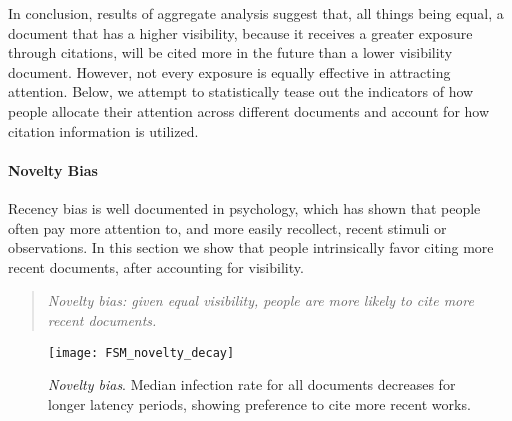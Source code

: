 \documentclass[10pt]{bmc_article}
\newenvironment{bmcformat}{\baselineskip20pt\sloppy\setboolean{publ}{false}}{\baselineskip20pt\sloppy}
\begin{document}
\begin{bmcformat}
In conclusion, results of aggregate analysis suggest that, all things being equal, a document that has a higher visibility, because it receives a greater exposure through citations, will be cited more in the future than a lower visibility document.
However, not every exposure is equally effective in attracting attention. Below, we attempt to statistically tease out the indicators of how people allocate their attention across different documents and account for how citation information is utilized.

\paragraph{Novelty Bias}
Recency bias is well documented in psychology, which has shown that people often pay more attention to, and more easily recollect, recent stimuli or observations. In this section we show that people intrinsically favor citing more recent documents, after accounting for visibility.
%
\begin{quotation}
\noindent \emph{Novelty bias: given equal visibility, people are more likely to cite more recent documents.}
\end{quotation}

\begin{figure}%
   \centering
   \texttt{[image: FSM\_novelty\_decay]}
   \caption{\emph{Novelty bias}. Median infection rate for all documents decreases for longer latency periods, showing preference to cite more recent works.}
   \label{fig:novelty}
\end{figure}


\end{bmcformat}
\end{document}
